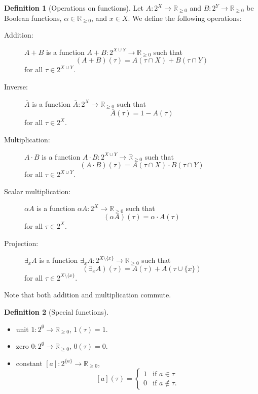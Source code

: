 \documentclass{article}
\theoremstyle{definition}
\newtheorem{definition}{Definition}
\theoremstyle{remark}
\begin{document}
\begin{definition}[Operations on functions]
  Let $A\colon 2^X \to \mathbb{R}_{\ge 0}$ and $B\colon 2^Y \to \mathbb{R}_{\ge
    0}$ be Boolean functions, $\alpha \in \mathbb{R}_{\ge 0}$, and $x \in X$. We
  define the following operations:
  \begin{description}
  \item[Addition:] $A+B$ is a function $A+B\colon 2^{X \cup Y} \to
    \mathbb{R}_{\ge 0}$ such that
    \[
      (A+B)(\tau) = A(\tau \cap X) + B(\tau \cap Y)
    \]
    for all $\tau \in 2^{X \cup Y}$.
  \item[Inverse:] $\overline{A}$ is a function $\overline{A}\colon 2^X \to
    \mathbb{R}_{\ge 0}$ such that
    \[
      \overline{A}(\tau) = 1 - A(\tau)
    \]
    for all $\tau \in 2^X$.
  \item[Multiplication:] $A \cdot B$ is a function $A \cdot B\colon 2^{X \cup Y}
    \to \mathbb{R}_{\ge 0}$ such that
    \[
      (A \cdot B)(\tau) = A(\tau \cap X) \cdot B(\tau \cap Y)
    \]
    for all $\tau \in 2^{X \cup Y}$.
  \item[Scalar multiplication:] $\alpha A$ is a function $\alpha A\colon 2^X \to
    \mathbb{R}_{\ge 0}$ such that
    \[
      (\alpha A)(\tau) = \alpha \cdot A(\tau)
    \]
    for all $\tau \in 2^X$.
  \item[Projection:] $\exists_xA$ is a function $\exists_xA\colon 2^{X \setminus
      \{ x \}} \to \mathbb{R}_{\ge 0}$ such that
    \[
      (\exists_xA)(\tau) = A(\tau) + A(\tau \cup \{ x \})
    \]
    for all $\tau \in 2^{X \setminus \{x \}}$.
  \end{description}
\end{definition}
Note that both addition and multiplication commute.

\begin{definition}[Special functions]
  \phantom{}
  \begin{itemize}
  \item unit $1\colon 2^\emptyset \to \mathbb{R}_{\ge 0}$, $1(\tau) = 1$.
  \item zero $0\colon 2^\emptyset \to \mathbb{R}_{\ge 0}$, $0(\tau) = 0$.
  \item constant $[a]\colon 2^{\{a\}} \to \mathbb{R}_{\ge 0}$,
    \[
      [a](\tau) =
      \begin{cases}
        1 & \text{if } a \in \tau \\
        0 & \text{if } a \not\in \tau.
      \end{cases}
    \]
  \end{itemize}
\end{definition}
\end{document}
